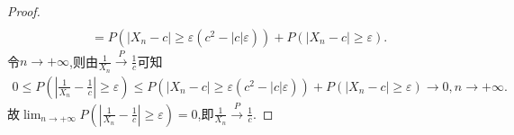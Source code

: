 \documentclass[lang=cn,newtx,10pt,sCheme=Chinese,citestyle=gb7714-2015, bibstyle=gb7714-2015]{../../Template/elegantbook}
\begin{document}
\begin{proof}
\begin{align*}
\\
&= P\left(\left|X_n - c\right| \geqslant \varepsilon(c^2 - |c|\varepsilon)\right) + P\left(\left|X_n - c\right| \geqslant \varepsilon\right).
\end{align*}
令\(n \to +\infty\),则由\(\frac{1}{X_n} \overset{P}{\rightarrow} \frac{1}{c}\)可知
\begin{align*}
0 \leqslant P\left(\left|\frac{1}{X_n} - \frac{1}{c}\right| \geqslant \varepsilon\right) \leqslant P\left(\left|X_n - c\right| \geqslant \varepsilon(c^2 - |c|\varepsilon)\right) + P\left(\left|X_n - c\right| \geqslant \varepsilon\right) \to 0,n \to +\infty .
\end{align*}
故\(\lim_{n \to +\infty}P\left(\left|\frac{1}{X_n} - \frac{1}{c}\right| \geqslant \varepsilon\right) = 0\),即\(\frac{1}{X_n} \overset{P}{\rightarrow} \frac{1}{c}\).

\end{proof}
\end{document}
